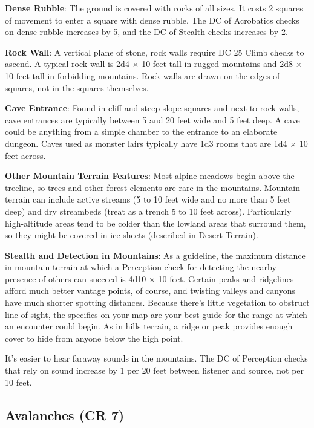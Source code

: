 \textbf{Dense Rubble}: The ground is covered with rocks of all sizes. It costs 2 squares of movement to enter a square with dense rubble. The DC of Acrobatics checks on dense rubble increases by 5, and the DC of Stealth checks increases by 2. 
				
\textbf{Rock Wall}: A vertical plane of stone, rock walls require DC 25 Climb checks to ascend. A typical rock wall is 2d4 \mbox{$\times$} 10 feet tall in rugged mountains and 2d8 \mbox{$\times$} 10 feet tall in forbidding mountains. Rock walls are drawn on the edges of squares, not in the squares themselves.
				
\textbf{Cave Entrance}: Found in cliff and steep slope squares and next to rock walls, cave entrances are typically between 5 and 20 feet wide and 5 feet deep. A cave could be anything from a simple chamber to the entrance to an elaborate dungeon. Caves used as monster lairs typically have 1d3 rooms that are 1d4 \mbox{$\times$} 10 feet across. 
				
\textbf{Other Mountain Terrain Features}: Most alpine meadows begin above the treeline, so trees and other forest elements are rare in the mountains. Mountain terrain can include active streams (5 to 10 feet wide and no more than 5 feet deep) and dry streambeds (treat as a trench 5 to 10 feet across). Particularly high-altitude areas tend to be colder than the lowland areas that surround them, so they might be covered in ice sheets (described in Desert Terrain).
				
\textbf{Stealth and Detection in Mountains}: As a guideline, the maximum distance in mountain terrain at which a Perception check for detecting the nearby presence of others can succeed is 4d10 \mbox{$\times$} 10 feet. Certain peaks and ridgelines afford much better vantage points, of course, and twisting valleys and canyons have much shorter spotting distances. Because there's little vegetation to obstruct line of sight, the specifics on your map are your best guide for the range at which an encounter could begin. As in hills terrain, a ridge or peak provides enough cover to hide from anyone below the high point.
				
It's easier to hear faraway sounds in the mountains. The DC of Perception checks that rely on sound increase by 1 per 20 feet between listener and source, not per 10 feet.
				
\subsection{Avalanches (CR 7)}

